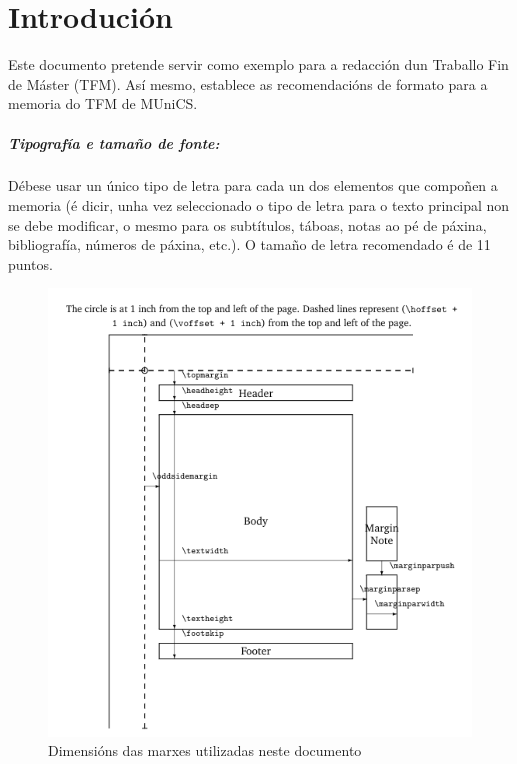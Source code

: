 \chapter{Introdución}
\label{sec:intro}



Este documento pretende servir como exemplo para a redacción dun Traballo Fin de Máster (TFM). Así mesmo, establece as recomendacións de formato para a memoria do TFM de MUniCS. 

\paragraph{Tipografía e tamaño de fonte:} Débese usar un único tipo de letra para cada un dos elementos que compoñen a memoria (é dicir, unha vez seleccionado o tipo de letra para o texto principal non se debe modificar, o mesmo para os subtítulos, táboas, notas ao pé de páxina, bibliografía, números de páxina, etc.). O tamaño de letra recomendado é de 11 puntos. 



\begin{figure}[htbp!]
    \centering
    \includegraphics[width=\textwidth]{my-munics-tfm/images/layout.png}
    \caption{Dimensións das marxes utilizadas neste documento}
    \label{fig:layout}
\end{figure}


